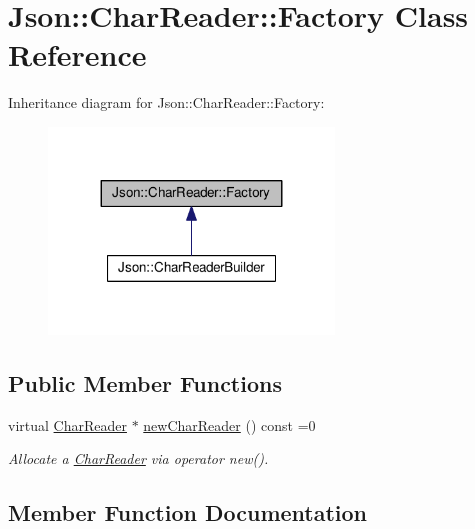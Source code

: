 \hypertarget{class_json_1_1_char_reader_1_1_factory}{}\section{Json\+:\+:Char\+Reader\+:\+:Factory Class Reference}
\label{class_json_1_1_char_reader_1_1_factory}


Inheritance diagram for Json\+:\+:Char\+Reader\+:\+:Factory\+:
\nopagebreak
\begin{figure}[H]
\begin{center}
\leavevmode
\includegraphics[width=215pt]{class_json_1_1_char_reader_1_1_factory__inherit__graph}
\end{center}
\end{figure}
\subsection*{Public Member Functions}
\begin{DoxyCompactItemize}
\item 
virtual \hyperlink{class_json_1_1_char_reader}{Char\+Reader} $\ast$ \hyperlink{class_json_1_1_char_reader_1_1_factory_a4c5862a1ffd432372dbe65cf59de98c4}{new\+Char\+Reader} () const =0
\begin{DoxyCompactList}\small\item\em Allocate a \hyperlink{class_json_1_1_char_reader}{Char\+Reader} via operator new(). \end{DoxyCompactList}\end{DoxyCompactItemize}


\subsection{Member Function Documentation}
